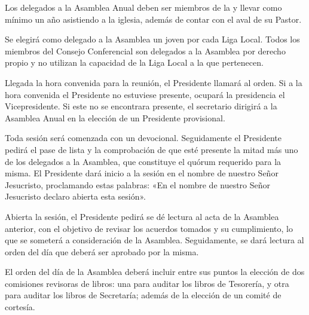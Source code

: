 


\article
\label{participacion-asamblea}
Los delegados a la Asamblea Anual deben ser miembros de la \LMJ{} y llevar como mínimo un año asistiendo a la iglesia, además de contar con el aval de su Pastor.

\article
\label{delegados-asamblea}
Se elegirá como delegado a la Asamblea un joven por cada Liga Local. Todos los miembros del Consejo Conferencial son delegados a la Asamblea por derecho propio y no utilizan la capacidad de la Liga Local a la que pertenecen.


\article
\label{eleccion-presidente-sustituto}
Llegada la hora convenida para la reunión, el Presidente llamará al orden. Si a la hora convenida el Presidente no estuviese presente, ocupará la presidencia el Vicepresidente. Si este no se encontrara presente, el secretario dirigirá a la Asamblea Anual en la elección de un Presidente provisional.

\article
Toda sesión será comenzada con un devocional. Seguidamente el Presidente pedirá el pase de lista y la comprobación de que esté presente la mitad más uno de los delegados a la Asamblea, que constituye el quórum requerido para la misma. El Presidente dará inicio a la sesión en el nombre de nuestro Señor Jesucristo, proclamando estas palabras: «En el nombre de nuestro Señor Jesucristo declaro abierta esta sesión».

\article
Abierta la sesión, el Presidente pedirá se dé lectura al acta de la Asamblea anterior, con el objetivo de revisar los acuerdos tomados y su cumplimiento, lo que se someterá a consideración de la Asamblea. Seguidamente, se dará lectura al orden del día que deberá ser aprobado por la misma.

\article
El orden del día de la Asamblea deberá incluir entre sus puntos la elección de dos comisiones revisoras de libros: una para auditar los libros de Tesorería, y otra para auditar los libros de Secretaría; además de la elección de un comité de cortesía.


